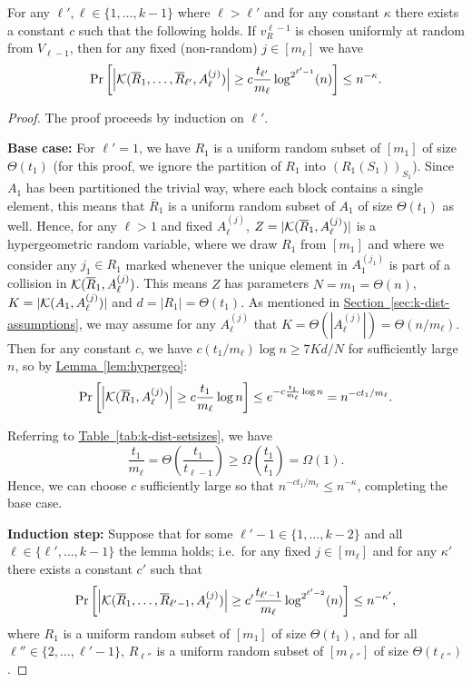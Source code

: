 \documentclass{theoretics}
\renewcommand{\sec}[1]{\hyperref[sec:#1]{Section~\ref*{sec:#1}}}
\newcommand{\lem}[1]{\hyperref[lem:#1]{Lemma~\ref*{lem:#1}}}
\newcommand{\tabl}[1]{\hyperref[tab:#1]{Table~\ref*{tab:#1}}}
\renewcommand{\>}{\rangle}
\newcommand{\<}{\langle}
\renewcommand{\(}{\left(}
\renewcommand{\)}{\right)}
\def\abs#1{\left| #1 \right|}
\begin{document}
\begin{lemma}\label{lem:setup-probability}
For any $\ell',\ell \in \{1,\dots,k-1\}$ where $\ell > \ell'$ and for any constant $\kappa$ there exists a constant $c$ such that the following holds. 
If $v_{R}^{\ell-1}$ is chosen uniformly at random from $V_{\ell-1}$, then for any fixed (non-random) $j\in [m_{\ell}]$ we have 
	$$\Pr\left[\abs{{\cal K}(\overline{R}_1,\dots,\overline{R}_{\ell'},A_{\ell}^{(j)})}\geq c\frac{t_{\ell'}}{m_{\ell}}\log^{2^{\ell'-1}} (n)\right]\leq n^{-\kappa}.$$
\end{lemma}
\begin{proof}
	The proof proceeds by induction on $\ell'$.
	

\noindent\textbf{Base case:}
For $\ell'=1$, we have $R_1$ is a uniform random subset of $[m_1]$ of size $\Theta(t_1)$ (for this proof, we ignore the partition of $R_1$ into $(R_1(S_1))_{S_1}$). Since $A_1$ has been partitioned the trivial way, where each block contains a single element, this means that $\overline{R}_1$ is a uniform random subset of $A_1$ of size $\Theta(t_1)$ as well. Hence, for any $\ell>1$ and fixed $A_\ell^{(j)}$, $Z=|{\cal K}(\overline{R}_1, A_{\ell}^{(j)})|$ is a hypergeometric random variable, where we draw $R_1$ from $[m_1]$ and where we consider any $j_1 \in R_1$ marked whenever the unique element in $A_1^{(j_1)}$ is part of a collision in ${\cal K}(\overline{R}_1, A_{\ell}^{(j)})$. This means $Z$ has parameters $N=m_1= \Theta(n)$, $K=|{\cal K}(A_1, A_{\ell}^{(j)})|$ and $d=|R_1|= \Theta(t_1)$. As mentioned in \sec{k-dist-assumptions}, we may assume for any $A_{\ell}^{(j)}$ that $K = \Theta\left(\abs{A_{\ell}^{(j)}}\right) = \Theta(n/m_{\ell})$. Then for any constant $c$, we have $c(t_1/m_{\ell})\log n\geq 7Kd/N$ for sufficiently large $n$, so by \lem{hypergeo}:
$$ \Pr\left[\abs{{\cal K}(\overline{R}_1, A_{\ell}^{(j)})}\geq c\frac{t_1}{m_{\ell}}\log n\right]\leq e^{-c\frac{t_1}{m_{\ell}}\log n}=n^{-ct_1/m_{\ell}}.$$


\noindent Referring to \tabl{k-dist-setsizes}, we have
$$\frac{t_1}{m_{\ell}} = \Theta\left(\frac{t_1}{t_{\ell-1}}\right) \geq \Omega \left(\frac{t_1}{t_{1}}\right)= \Omega(1).$$
Hence, we can choose $c$ sufficiently large so that $n^{-ct_1/m_{\ell}}\leq n^{-\kappa}$, completing the base case.
	
\noindent\textbf{Induction step:}
Suppose that for some $\ell'-1 \in \{1,\dots,k-2\}$ and all $\ell \in \{\ell',\dots,k-1\}$ the lemma holds; i.e.~for any fixed $j \in [m_{\ell}]$ and for any $\kappa'$ there exists a constant $c'$ such that
$$\Pr\left[\abs{{\cal K}(\overline{R}_1,\dots,\overline{R}_{\ell'-1},A_{\ell}^{(j)})}\geq c'\frac{t_{\ell'-1}}{m_{\ell}}\log^{2^{\ell'-2}} (n)\right]\leq n^{-\kappa'},$$
where $R_1$ is a uniform random subset of $[m_1]$ of size $\Theta(t_1)$, and for all $\ell''\in\{2,\dots,\ell'-1\}$, $R_{\ell''}$ is a uniform random subset of $[m_{\ell''}]$ of size $\Theta(t_{\ell''})$.


\end{proof}
\end{document}
